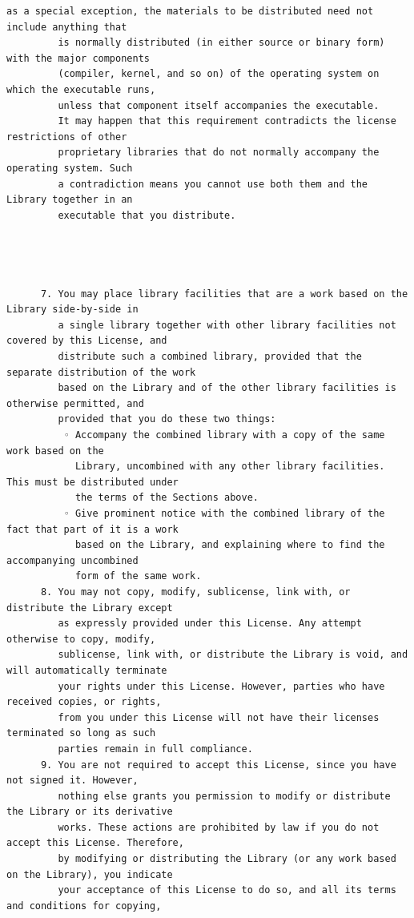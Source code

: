 \begin{lstlisting}[basicstyle=\ttfamily\footnotesize,breaklines=true]
         as a special exception, the materials to be distributed need not include anything that
         is normally distributed (in either source or binary form) with the major components
         (compiler, kernel, and so on) of the operating system on which the executable runs,
         unless that component itself accompanies the executable.
         It may happen that this requirement contradicts the license restrictions of other
         proprietary libraries that do not normally accompany the operating system. Such
         a contradiction means you cannot use both them and the Library together in an
         executable that you distribute.




      7. You may place library facilities that are a work based on the Library side-by-side in
         a single library together with other library facilities not covered by this License, and
         distribute such a combined library, provided that the separate distribution of the work
         based on the Library and of the other library facilities is otherwise permitted, and
         provided that you do these two things:
          ◦ Accompany the combined library with a copy of the same work based on the
            Library, uncombined with any other library facilities. This must be distributed under
            the terms of the Sections above.
          ◦ Give prominent notice with the combined library of the fact that part of it is a work
            based on the Library, and explaining where to find the accompanying uncombined
            form of the same work.
      8. You may not copy, modify, sublicense, link with, or distribute the Library except
         as expressly provided under this License. Any attempt otherwise to copy, modify,
         sublicense, link with, or distribute the Library is void, and will automatically terminate
         your rights under this License. However, parties who have received copies, or rights,
         from you under this License will not have their licenses terminated so long as such
         parties remain in full compliance.
      9. You are not required to accept this License, since you have not signed it. However,
         nothing else grants you permission to modify or distribute the Library or its derivative
         works. These actions are prohibited by law if you do not accept this License. Therefore,
         by modifying or distributing the Library (or any work based on the Library), you indicate
         your acceptance of this License to do so, and all its terms and conditions for copying,

\end{lstlisting}
